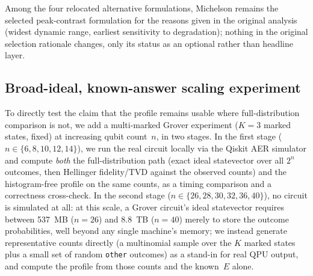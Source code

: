 Among the four relocated alternative formulations, Michelson remains the selected peak-contrast formulation for the reasons given in the original analysis (widest dynamic range, earliest sensitivity to degradation); nothing in the original selection rationale changes, only its status as an optional rather than headline layer.



\subsection{Broad-ideal, known-answer scaling experiment}
\label{sec:broad-ideal}

To directly test the claim that the profile remains usable where full-distribution comparison is not, we add a multi-marked Grover experiment ($K=3$ marked states, fixed) at increasing qubit count~$n$, in two stages. In the first stage ($n \in \{6, 8, 10, 12, 14\}$), we run the real circuit locally via the Qiskit AER simulator and compute \emph{both} the full-distribution path (exact ideal statevector over all $2^n$ outcomes, then Hellinger fidelity/TVD against the observed counts) and the histogram-free profile on the same counts, as a timing comparison and a correctness cross-check. In the second stage ($n \in \{26, 28, 30, 32, 36, 40\}$), no circuit is simulated at all: at this scale, a Grover circuit's ideal statevector requires between 537~MB ($n=26$) and 8.8~TB ($n=40$) merely to store the outcome probabilities, well beyond any single machine's memory; we instead generate representative counts directly (a multinomial sample over the $K$ marked states plus a small set of random \texttt{other} outcomes) as a stand-in for real QPU output, and compute the profile from those counts and the known~$E$ alone.



